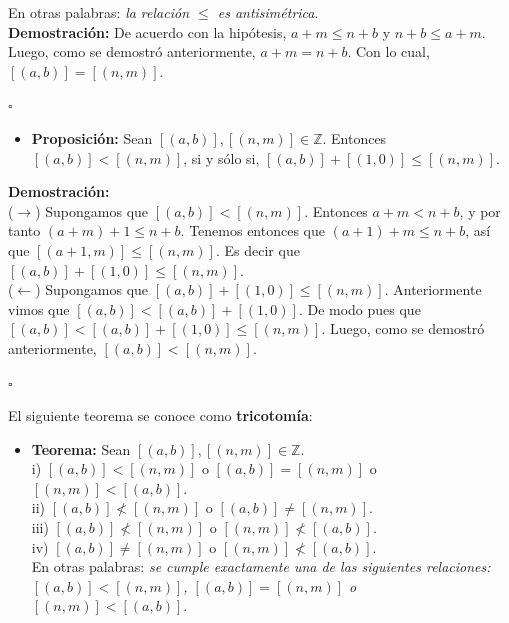 \documentclass[10 pt]{article}
\begin{document}
\Large{En otras palabras: \textit{la relación $\leq$ es antisimétrica}.} \\

\Large{\textbf{Demostración:} De acuerdo con la hipótesis, $a+m \leq n+b$ y $n+b \leq a+m$. Luego, como se demostró anteriormente, $a+m=n+b$. Con lo cual, $[(a,b)]=[(n,m)]$.} \\

\begin{flushright}
    $\square$
\end{flushright}

\begin{itemize}
    \item \Large{\textbf{Proposición:} Sean $[(a,b)],[(n,m)] \in \mathbb Z$. Entonces $[(a,b)]<[(n,m)]$, si y sólo si, $[(a,b)]+[(1,0)] \leq [(n,m)]$.} \\
\end{itemize}

\Large{\textbf{Demostración:} \\

($\rightarrow$) Supongamos que $[(a,b)]<[(n,m)]$. Entonces $a+m<n+b$, y por tanto $(a+m)+1 \leq n+b$. Tenemos entonces que $(a+1)+m \leq n+b$, así que $[(a+1,m)] \leq [(n,m)]$. Es decir que $[(a,b)]+[(1,0)] \leq [(n,m)]$. \\

($\leftarrow$) Supongamos que $[(a,b)]+[(1,0)] \leq [(n,m)]$. Anteriormente vimos que $[(a,b)]<[(a,b)]+[(1,0)]$. De modo pues que $[(a,b)]<[(a,b)]+[(1,0)] \leq [(n,m)]$. Luego, como se demostró anteriormente, $[(a,b)]<[(n,m)]$.}\\

\begin{flushright}
    $\square$
\end{flushright}

\Large{El siguiente teorema se conoce como \textbf{tricotomía}:} \\

\begin{itemize}
    \item \Large{\textbf{Teorema:} Sean $[(a,b)],[(n,m)] \in \mathbb Z$. \\

    i) $[(a,b)]<[(n,m)]$ o $[(a,b)]=[(n,m)]$ o $[(n,m)]<[(a,b)]$. \\

    ii) $[(a,b)] \nless [(n,m)]$ o $[(a,b)] \neq [(n,m)]$. \\

    iii) $[(a,b)] \nless [(n,m)]$ o $[(n,m)] \nless [(a,b)]$. \\

    iv) $[(a,b)] \neq [(n,m)]$ o $[(n,m)] \nless [(a,b)]$. \\

     En otras palabras: \textit{se cumple exactamente una de las siguientes relaciones: $[(a,b)]<[(n,m)]$, $[(a,b)]=[(n,m)]$ o $[(n,m)]<[(a,b)]$}.} \\
\end{itemize}
\end{document}
